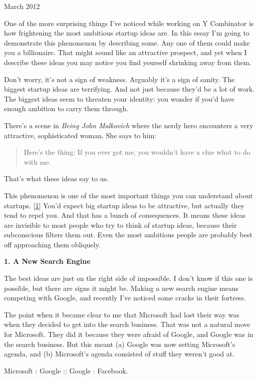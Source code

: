 March 2012

One of the more surprising things I've noticed while working on Y
Combinator is how frightening the most ambitious startup ideas are. In
this essay I'm going to demonstrate this phenomenon by describing some.
Any one of them could make you a billionaire. That might sound like an
attractive prospect, and yet when I describe these ideas you may notice
you find yourself shrinking away from them.

Don't worry, it's not a sign of weakness. Arguably it's a sign of
sanity. The biggest startup ideas are terrifying. And not just because
they'd be a lot of work. The biggest ideas seem to threaten your
identity: you wonder if you'd have enough ambition to carry them
through.

There's a scene in \emph{Being John Malkovich} where the nerdy hero
encounters a very attractive, sophisticated woman. She says to him:

\begin{quote}
Here's the thing: If you ever got me, you wouldn't have a clue what to
do with me.
\end{quote}

That's what these ideas say to us.

This phenomenon is one of the most important things you can understand
about startups. {[}\hyperref[f1n]{1}{]} You'd expect big startup ideas
to be attractive, but actually they tend to repel you. And that has a
bunch of consequences. It means these ideas are invisible to most people
who try to think of startup ideas, because their subconscious filters
them out. Even the most ambitious people are probably best off
approaching them obliquely.

\textbf{1. A New Search Engine}

The best ideas are just on the right side of impossible. I don't know if
this one is possible, but there are signs it might be. Making a new
search engine means competing with Google, and recently I've noticed
some cracks in their fortress.

The point when it became clear to me that Microsoft had lost their way
was when they decided to get into the search business. That was not a
natural move for Microsoft. They did it because they were afraid of
Google, and Google was in the search business. But this meant (a) Google
was now setting Microsoft's agenda, and (b) Microsoft's agenda consisted
of stuff they weren't good at.

Microsoft : Google :: Google : Facebook.

